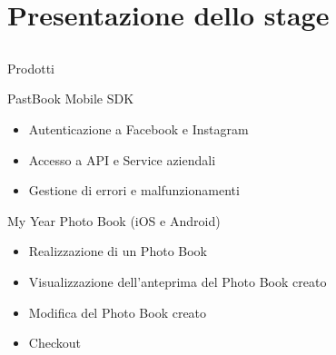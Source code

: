 \section{Presentazione dello stage}
	\subsection{}
		\begin{frame}{Prodotti}
			\begin{block}{PastBook Mobile SDK}
				\begin{itemize}
					\item Autenticazione a Facebook e Instagram
					\item Accesso a API e Service aziendali
					\item Gestione di errori e malfunzionamenti
				\end{itemize}
			\end{block}
			\begin{block}{My Year Photo Book (iOS e Android)}
				\begin{itemize}
					\item Realizzazione di un Photo Book
					\item Visualizzazione dell'anteprima del Photo Book creato
					\item Modifica del Photo Book creato
					\item Checkout
				\end{itemize}
			\end{block}
		\end{frame}
